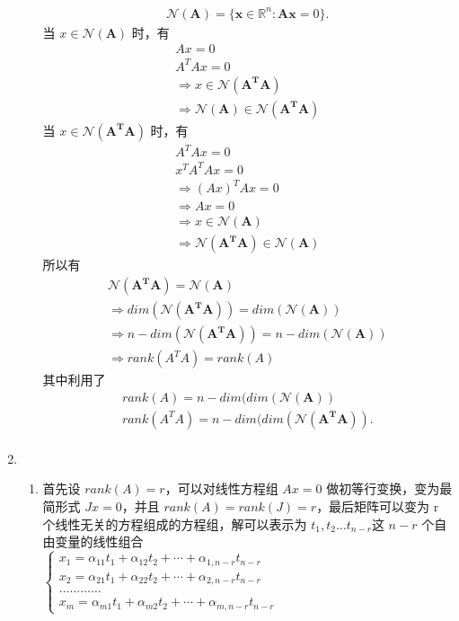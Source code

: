 \documentclass[11pt,letter,notitlepage]{article}
\begin{document}
\begin{solution}
\begin{enumerate}
\begin{enumerate}
			\begin{align*}
			\mathcal{N}(\mathbf{A})  = \{ \mathbf{x}\in \mathbb{R}^n : \mathbf{Ax}=0\}.
			\end{align*}
			当 $x \in \mathcal{N}(\mathbf{A})$ 时，有
			\begin{align*}
				Ax = 0\\
			A^TAx = 0\\
			 \Rightarrow x \in \mathcal{N}(\mathbf{A^TA})\\
			 \Rightarrow \mathcal{N}(\mathbf{A}) \in \mathcal{N}(\mathbf{A^TA})
			\end{align*}
			当 $x \in \mathcal{N}(\mathbf{A^TA})$ 时，有
			\begin{align*}
			A^TAx = 0\\
			x^TA^TAx = 0\\
			\Rightarrow (Ax)^TAx = 0\\
			\Rightarrow Ax = 0\\
			\Rightarrow x \in \mathcal{N}(\mathbf{A})\\
			\Rightarrow \mathcal{N}(\mathbf{A^TA}) \in \mathcal{N}(\mathbf{A})
			\end{align*}
			所以有
			\begin{align*}
			\mathcal{N}(\mathbf{A^TA}) = \mathcal{N}(\mathbf{A})\\
			\Rightarrow dim(\mathcal{N}(\mathbf{A^TA})) = dim(\mathcal{N}(\mathbf{A}))\\
			\Rightarrow n - dim(\mathcal{N}(\mathbf{A^TA})) = n - dim(\mathcal{N}(\mathbf{A}))\\
			\Rightarrow rank(A^TA) = rank(A)
			\end{align*}
			其中利用了
			\begin{align*}
			rank(A) = n - dim(dim(\mathcal{N}(\mathbf{A}))\\
			rank(A^TA) = n - dim(dim(\mathcal{N}(\mathbf{A^TA})).\\
			\end{align*}
		\end{enumerate}
		\item \ \\
		\begin{enumerate}
			\item 首先设 $rank(A) = r$，可以对线性方程组 $Ax = 0$ 做初等行变换，变为最简形式 $ Jx = 0$，并且 $rank(A) = rank(J) = r$，最后矩阵可以变为 r 个线性无关的方程组成的方程组，解可以表示为 $ t_1, t_2\dots t_{n - r} $这 $n - r$ 个自由变量的线性组合\\
			$\left\{\begin{array}{l}{x_{1}=\alpha_{11} t_{1}+\alpha_{12} t_{2}+\cdots+\alpha_{1, n-r} t_{n-r}} \\ {x_{2}=\alpha_{21} t_{1}+\alpha_{22} t_{2}+\cdots+\alpha_{2, n-r} t_{n-r}} \\ {\ldots \ldots \ldots \ldots} \\ {x_{m}=\alpha_{m 1} t_{1}+\alpha_{m 2} t_{2}+\cdots+\alpha_{m, n-r} t_{n-r}}\end{array}\right.$\\

\end{enumerate}
\end{enumerate}
\end{solution}
\end{document}
